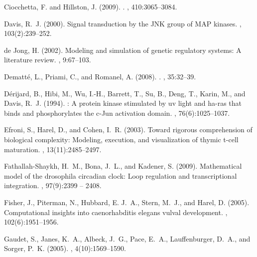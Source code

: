 \documentclass{bioinfo}
\begin{document}
\begin{thebibliography}{}
Ciocchetta, F. and Hillston, J. (2009).
.
, 410:3065--3084.

Davis, R.~J. (2000).
\newblock Signal transduction by the {JNK} group of {MAP} kinases.
, 103(2):239--252.

{de Jong}, H. (2002).
\newblock Modeling and simulation of genetic regulatory systems: A literature
  review.
, 9:67--103.

Dematt\'{e}, L., Priami, C., and Romanel, A. (2008).
.
, 35:32--39.

D{\'{e}}rijard, B., Hibi, M., Wu, I.-H., Barrett, T., Su, B., Deng, T., Karin,
  M., and Davis, R.~J. (1994).
: A protein kinase stimulated by uv light and ha-ras that binds
  and phosphorylates the c-{Jun} activation domain.
, 76(6):1025--1037.

Efroni, S., Harel, D., and Cohen, I.~R. (2003).
\newblock Toward rigorous comprehension of biological complexity: Modeling,
  execution, and visualization of thymic t-cell maturation.
, 13(11):2485--2497.

Fathallah-Shaykh, H.~M., Bona, J.~L., and Kadener, S. (2009).
\newblock Mathematical model of the drosophila circadian clock: Loop regulation
  and transcriptional integration.
, 97(9):2399 -- 2408.

Fisher, J., Piterman, N., Hubbard, E. J.~A., Stern, M.~J., and Harel, D.
  (2005).
\newblock Computational insights into caenorhabditis elegans vulval
  development.
, 102(6):1951--1956.

Gaudet, S., Janes, K.~A., Albeck, J.~G., Pace, E.~A., Lauffenburger, D.~A., and
  Sorger, P.~K. (2005).
, 4(10):1569--1590.


\end{thebibliography}
\end{document}
